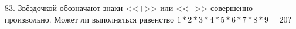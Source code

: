 83. Звёздочкой обозначают знаки <<$+$>> или <<$-$>> совершенно произвольно. Может ли выполняться равенство $1*2*3*4*5*6*7*8*9=20?$\\
